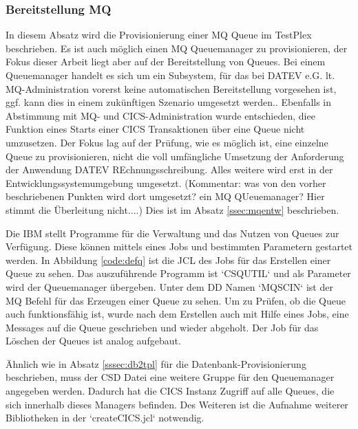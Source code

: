 \subsubsection{Bereitstellung MQ}\label{sssec:mqtplx}
In diesem Absatz wird die Provisionierung einer MQ Queue im TestPlex beschrieben. 
Es ist auch möglich einen MQ Queuemanager zu provisionieren, der Fokus dieser Arbeit liegt aber auf der Bereitstellung von Queues. 
Bei einem Queuemanager handelt es sich um ein Subsystem, für das bei DATEV e.G. lt. MQ-Administration vorerst keine automatischen Bereitstellung vorgesehen ist, ggf. kann dies in einem zukünftigen Szenario umgesetzt werden..
Ebenfalls in Abstimmung mit MQ- und CICS-Administration wurde entschieden, diee Funktion eines Starts einer CICS Transaktionen über eine Queue nicht umzusetzen. Der Fokus lag auf der Prüfung, wie es möglich ist, eine einzelne Queue zu provisionieren, nicht die  voll umfängliche Umsetzung der Anforderung der Anwendung DATEV REchnungsschreibung. 
Alles weitere wird erst in der Entwicklungssystemumgebung umgesetzt. (Kommentar: was von den vorher beschriebenen Punkten wird dort umgesetzt? ein MQ QUeuemanager? Hier stimmt die Überleitung nicht....)
Dies ist im Absatz \ref{ssec:mqentw} beschrieben.

Die IBM stellt Programme für die Verwaltung und das Nutzen von Queues  zur Verfügung.
Diese können mittels eines Jobs und bestimmten Parametern gestartet werden.
In Abbildung \ref{code:defq} ist die JCL des Jobs für das Erstellen einer Queue zu sehen.
Das auszuführende Programm ist `CSQUTIL` und als Parameter wird der Queuemanager übergeben.
Unter dem DD Namen `MQSCIN` ist der MQ Befehl für das Erzeugen einer Queue zu sehen.
Um zu Prüfen, ob die Queue auch funktionsfähig ist, wurde nach dem Erstellen auch mit Hilfe eines Jobs, eine Messages auf die Queue geschrieben und wieder abgeholt.
Der Job für das Löschen der Queues ist analog aufgebaut.

Ähnlich wie in Absatz \ref{sssec:db2tpl} für die Datenbank-Provisionierung beschrieben, muss der CSD Datei eine weitere Gruppe für den Queuemanager angegeben werden.
Dadurch hat die CICS Instanz Zugriff auf alle Queues, die sich innerhalb dieses Managers befinden.
Des Weiteren ist die Aufnahme weiterer Bibliotheken in der `createCICS.jcl` notwendig.

